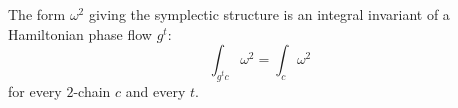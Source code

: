 The form $\omega^2$ giving the symplectic structure is an integral invariant of a Hamiltonian phase flow $g^t$:
$$
\int_{g^t c} \omega^2 = \int_c \omega^2
$$
for every $2$-chain $c$ and every $t$.
